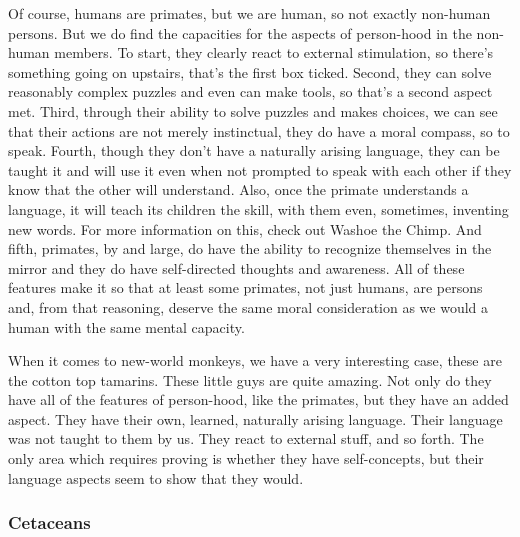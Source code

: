 Of course, humans are primates, but we are human, so not exactly non-human persons. But we do find the capacities for the aspects of person-hood in the non-human members. To start, they clearly react to external stimulation, so there's something going on upstairs, that's the first box ticked. Second, they can solve reasonably complex puzzles and even can make tools, so that's a second aspect met. Third, through their ability to solve puzzles and makes choices, we can see that their actions are not merely instinctual, they do have a moral compass, so to speak. Fourth, though they don't have a naturally arising language, they can be taught it and will use it even when not prompted to speak with each other if they know that the other will understand. Also, once the primate understands a language, it will teach its children the skill, with them even, sometimes, inventing new words. For more information on this, check out Washoe the Chimp. And fifth, primates, by and large, do have the ability to recognize themselves in the mirror and they do have self-directed thoughts and awareness. All of these features make it so that at least some primates, not just humans, are persons and, from that reasoning, deserve the same moral consideration as we would a human with the same mental capacity. 

When it comes to new-world monkeys, we have a very interesting case, these are the cotton top tamarins. These little guys are quite amazing. Not only do they have all of the features of person-hood, like the primates, but they have an added aspect. They have their own, learned, naturally arising language. Their language was not taught to them by us. They react to external stuff, and so forth. The only area which requires proving is whether they have self-concepts, but their language aspects seem to show that they would. 
\subsubsection{Cetaceans}

